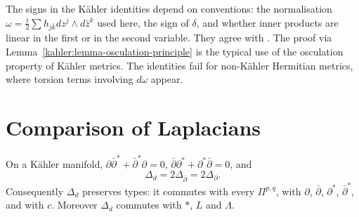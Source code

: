 \begin{remark}\label{kahler:remark-identities-conventions}
The signs in the K\"ahler identities depend on conventions: the normalisation $\omega = \frac{i}{2}\sum h_{j\bar k}dz^j \wedge d\bar z^k$
used here, the sign of $\delta$, and whether inner products are linear in the first or in the second variable. They agree with
\cite[Proposition 3.1.12]{huybrechts-complex}. The proof via Lemma~\ref{kahler:lemma-osculation-principle} is the typical use
of the osculation property of K\"ahler metrics. The identities fail for non-K\"ahler Hermitian metrics, where torsion terms involving
$d\omega$ appear.
\end{remark}

\section{Comparison of Laplacians}\label{kahler:section-laplacians}

\begin{theorem}\label{kahler:theorem-laplacians}
On a K\"ahler manifold, $\partial\bar\partial^* + \bar\partial^*\partial = 0$, $\bar\partial\partial^* + \partial^*\bar\partial = 0$, and
\[
\Delta_d = 2\Delta_{\bar\partial} = 2\Delta_\partial .
\]
Consequently $\Delta_d$ preserves types: it commutes with every $\Pi^{p,q}$, with $\partial$, $\bar\partial$, $\partial^*$,
$\bar\partial^*$, and with $c$. Moreover $\Delta_d$ commutes with $*$, $L$ and $\Lambda$.
\end{theorem}

